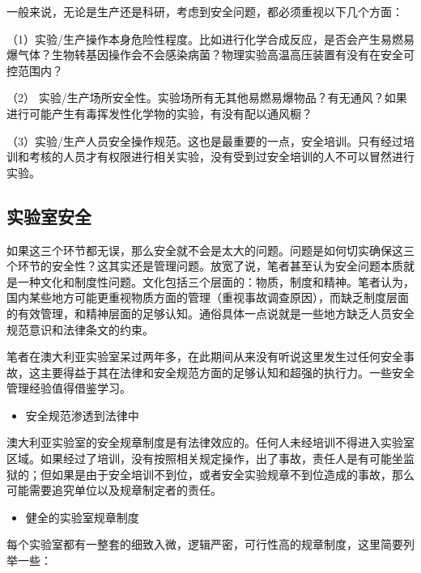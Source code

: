 \documentclass[
]{book}
\providecommand{\tightlist}{%
  \setlength{\itemsep}{0pt}\setlength{\parskip}{0pt}}
\begin{document}
一般来说，无论是生产还是科研，考虑到安全问题，都必须重视以下几个方面：

（1）实验/生产操作本身危险性程度。比如进行化学合成反应，是否会产生易燃易爆气体？生物转基因操作会不会感染病菌？物理实验高温高压装置有没有在安全可控范围内？

（2） 实验/生产场所安全性。实验场所有无其他易燃易爆物品？有无通风？如果进行可能产生有毒挥发性化学物的实验，有没有配以通风橱？

（3）实验/生产人员安全操作规范。这也是最重要的一点，安全培训。只有经过培训和考核的人员才有权限进行相关实验，没有受到过安全培训的人不可以冒然进行实验。

\hypertarget{ux5b9eux9a8cux5ba4ux5b89ux5168}{%
\subsection{实验室安全}\label{ux5b9eux9a8cux5ba4ux5b89ux5168}}

如果这三个环节都无误，那么安全就不会是太大的问题。问题是如何切实确保这三个环节的安全性？这其实还是管理问题。放宽了说，笔者甚至认为安全问题本质就是一种文化和制度性问题。文化包括三个层面的：物质，制度和精神。笔者认为，国内某些地方可能更重视物质方面的管理（重视事故调查原因），而缺乏制度层面的有效管理，和精神层面的足够认知。通俗具体一点说就是一些地方缺乏人员安全规范意识和法律条文的约束。

笔者在澳大利亚实验室呆过两年多，在此期间从来没有听说这里发生过任何安全事故，这主要得益于其在法律和安全规范方面的足够认知和超强的执行力。一些安全管理经验值得借鉴学习。

\begin{itemize}
\tightlist
\item
  安全规范渗透到法律中
\end{itemize}

澳大利亚实验室的安全规章制度是有法律效应的。任何人未经培训不得进入实验室区域。如果经过了培训，没有按照相关规定操作，出了事故，责任人是有可能坐监狱的；但如果是由于安全培训不到位，或者安全实验规章不到位造成的事故，那么可能需要追究单位以及规章制定者的责任。

\begin{itemize}
\tightlist
\item
  健全的实验室规章制度
\end{itemize}

每个实验室都有一整套的细致入微，逻辑严密，可行性高的规章制度，这里简要列举一些：
\end{document}
